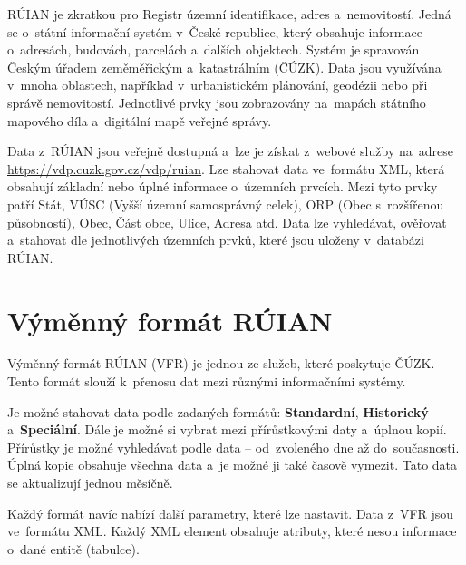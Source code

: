 RÚIAN je zkratkou pro Registr územní identifikace, adres a~nemovitostí.
Jedná se o~státní informační systém v~České republice, který obsahuje informace o~adresách, budovách, parcelách a~dalších objektech.
Systém je spravován Českým úřadem zeměměřickým a~katastrálním (ČÚZK).
Data jsou využívána v~mnoha oblastech, například v~urbanistickém plánování, geodézii nebo při správě nemovitostí.
Jednotlivé prvky jsou zobrazovány na~mapách státního mapového díla a~digitální mapě veřejné správy.

Data z~RÚIAN jsou veřejně dostupná a~lze je získat z~webové služby na~adrese \url{https://vdp.cuzk.gov.cz/vdp/ruian}.
Lze stahovat data ve~formátu XML, která obsahují základní nebo úplné informace o~územních prvcích.
Mezi tyto prvky patří Stát, VÚSC (Vyšší územní samosprávný celek), ORP (Obec s~rozšířenou působností), Obec, Část obce, Ulice, Adresa atd.
Data lze vyhledávat, ověřovat a~stahovat dle jednotlivých územních prvků, které jsou uloženy v~databázi RÚIAN.

\section{Výměnný formát RÚIAN}
Výměnný formát RÚIAN (VFR) je jednou ze služeb, které poskytuje ČÚZK.
Tento formát slouží k~přenosu dat mezi různými informačními systémy.

Je možné stahovat data podle zadaných formátů: \textbf{Standardní}, \textbf{Historický} a~\textbf{Speciální}.
Dále je možné si vybrat mezi přírůstkovými daty a~úplnou kopií.
Přírůstky je možné vyhledávat podle data -- od~zvoleného dne až do~současnosti.
Úplná kopie obsahuje všechna data a~je možné ji také časově vymezit. Tato data se aktualizují jednou měsíčně.

Každý formát navíc nabízí další parametry, které lze nastavit.
Data z~VFR jsou ve~formátu XML.
Každý XML element obsahuje atributy, které nesou informace o~dané entitě (tabulce).

\newpage

